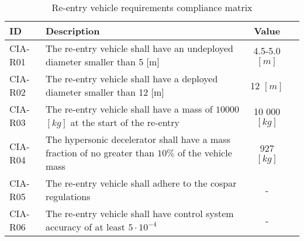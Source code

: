 \begin{table}[H]
\centering
	\caption{Re-entry vehicle requirements compliance matrix} 
	\label{tab:compv}
	\begin{tabular}{|p{}|p{}|c|c|}
	    \hline
	    ID          & Description   & Value &                                                                                           \\ \hline \hline
	CIA-R01 & The re-entry vehicle shall have an undeployed diameter smaller than 5 [m]                   & 4.5-5.0 $[m]$  & \cmark     				            \\ \hline
	CIA-R02 & The re-entry vehicle shall have a deployed diameter smaller than 12 [m]                     & 12 $[m]$ &  \cmark 				            \\ \hline	
	CIA-R03 & The re-entry vehicle shall have a mass of $10 000$ $[kg]$ at the start of the re-entry           & 10 000 $[kg]$ &  \cmark          				            \\ \hline
	CIA-R04 & The hypersonic decelerator shall have a mass fraction of no greater than $10\%$ of the vehicle mass	& 927 $[kg]$ & \cmark \\ \hline 
	CIA-R05 &  The re-entry vehicle shall adhere to the \gls{cospar} regulations  & - & \cmark \\ \hline
	CIA-R06 &  The re-entry vehicle shall have control system accuracy of at least $5\cdot 10^{-4}$ & - & \cmark \\ \hline
    \end{tabular}
\end{table}

\newpage

